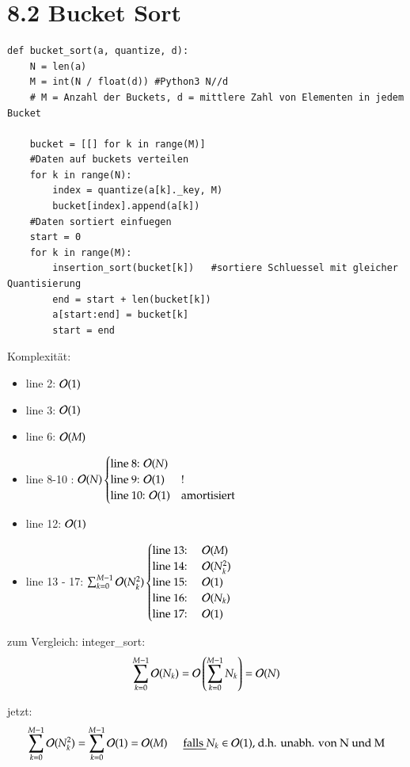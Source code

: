 \section*{8.2 Bucket Sort}

\begin{verbatim}
def bucket_sort(a, quantize, d):
    N = len(a)
    M = int(N / float(d)) #Python3 N//d
    # M = Anzahl der Buckets, d = mittlere Zahl von Elementen in jedem Bucket

    bucket = [[] for k in range(M)]
    #Daten auf buckets verteilen
    for k in range(N):
        index = quantize(a[k]._key, M)
        bucket[index].append(a[k])
    #Daten sortiert einfuegen
    start = 0
    for k in range(M):
        insertion_sort(bucket[k])   #sortiere Schluessel mit gleicher Quantisierung
        end = start + len(bucket[k])
        a[start:end] = bucket[k]
        start = end
\end{verbatim}
Komplexität:
\begin{itemize}
    \item line 2: $\mathcal{O}{}(1)$
    \item line 3: $\mathcal{O}{}(1)$
    \item line 6: $\mathcal{O}{}(M)$
    \item line 8-10 : $\mathcal{O}{}(N) \begin{cases}\text{line 8: } \mathcal{O}{}(N) & \\ \text{line 9: } \mathcal{O}{}(1) & ! \\ \text{line 10: }  \mathcal{O}{}(1) & \text{amortisiert}\end{cases}$
    \item line 12: $\mathcal{O}{}(1)$
    \item line 13 - 17: $\sum_{k=0}^{M-1} \mathcal{O}{}(N_k^2) \begin{cases} \text{line 13: } & \mathcal{O}{}(M) \\ \text{line 14: } & \mathcal{O}{}(N_k^2) \\  \text{line 15: } & \mathcal{O}{}(1)  \\\text{line 16: } & \mathcal{O}{}(N_k) \\  \text{line 17: } & \mathcal{O}{}(1) \\ \end{cases}$
\end{itemize}
zum Vergleich: integer\_sort:
\[ \sum_{k=0}^{M-1} \mathcal{O}{}(N_k) = \mathcal{O}{}\left( \sum_{k=0}^{M-1} N_k\right) = \mathcal{O}{}(N)\]

jetzt:
\[ \sum_{k=0}^{M-1} \mathcal{O}{}(N_k^2) = \sum_{k=0}^{M-1} \mathcal{O}{}(1) = \mathcal{O}{}(M) \hspace*{0.5cm} \underline{\text{falls }} N_k \in \mathcal{O}{}(1) \text{, d.h. unabh. von N und M} \]

